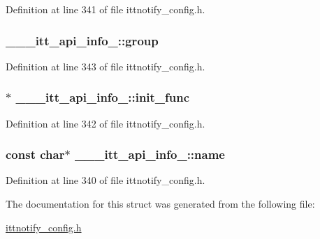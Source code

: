 Definition at line 341 of file ittnotify\-\_\-config.\-h.

\hypertarget{struct______itt__api__info__20101001_abd973a098fd9181d23e93fcb2a3de469}{
\subsubsection[{group}]{ \-\_\-\-\_\-\-\_\-itt\-\_\-api\-\_\-info\-\_\-::group}}\label{struct______itt__api__info__20101001_abd973a098fd9181d23e93fcb2a3de469}


Definition at line 343 of file ittnotify\-\_\-config.\-h.

\hypertarget{struct______itt__api__info__20101001_a2c2825ddd464d578ab867e86f83da253}{
\subsubsection[{init\-\_\-func}]{$\ast$ \-\_\-\-\_\-\-\_\-itt\-\_\-api\-\_\-info\-\_\-::init\-\_\-func}}\label{struct______itt__api__info__20101001_a2c2825ddd464d578ab867e86f83da253}


Definition at line 342 of file ittnotify\-\_\-config.\-h.

\hypertarget{struct______itt__api__info__20101001_a8e9d10c3041b72e1ea0355b40ee772a5}{
\subsubsection[{name}]{\setlength{\rightskip}{0pt plus 5cm}const char$\ast$ \-\_\-\-\_\-\-\_\-itt\-\_\-api\-\_\-info\-\_\-::name}}\label{struct______itt__api__info__20101001_a8e9d10c3041b72e1ea0355b40ee772a5}


Definition at line 340 of file ittnotify\-\_\-config.\-h.



The documentation for this struct was generated from the following file\-:\begin{DoxyCompactItemize}
\item 
\hyperlink{ittnotify__config_8h}{ittnotify\-\_\-config.\-h}\end{DoxyCompactItemize}
